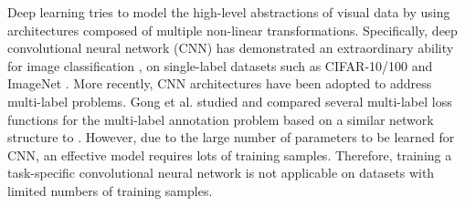 Deep learning tries to model the high-level abstractions of visual data by using architectures composed of multiple non-linear transformations. Specifically, deep convolutional neural network (CNN) \cite{8}
has demonstrated an extraordinary ability for image classification \cite{9}, \cite{10} on single-label datasets such as CIFAR-10/100 \cite{17} and ImageNet \cite{2}.
More recently, CNN architectures have been
adopted to address multi-label problems. Gong et
al. \cite{19} studied and compared several multi-label
loss functions for the multi-label annotation problem
based on a similar network structure to \cite{10}. However,
due to the large number of parameters to be learned
for CNN, an effective model requires lots of training
samples. Therefore, training a task-specific convolutional neural network is not applicable on datasets
with limited numbers of training samples.







